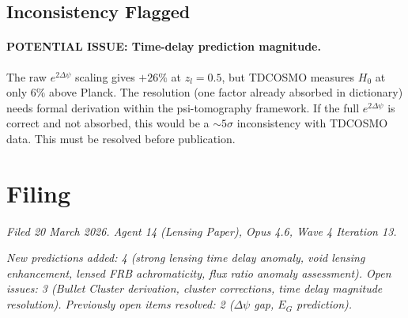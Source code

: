 \documentclass[11pt,a4paper]{article}
\newcommand{\Dpsi}{\Delta\psi}
\begin{document}
\subsection{Inconsistency Flagged}

\paragraph{POTENTIAL ISSUE: Time-delay prediction magnitude.}
The raw $e^{2\Dpsi}$ scaling gives $+26\%$ at $z_l = 0.5$,
but TDCOSMO measures $H_0$ at only $6\%$ above Planck.
The resolution (one factor already absorbed in dictionary)
needs formal derivation within the psi-tomography framework.
If the full $e^{2\Dpsi}$ is correct and not absorbed, this
would be a $\sim 5\sigma$ inconsistency with TDCOSMO data.
This must be resolved before publication.


\section*{Filing}

\textit{Filed 20 March 2026.  Agent 14 (Lensing Paper),
Opus 4.6, Wave 4 Iteration 13.}

\textit{New predictions added: 4 (strong lensing time delay
anomaly, void lensing enhancement, lensed FRB achromaticity,
flux ratio anomaly assessment).  Open issues: 3 (Bullet
Cluster derivation, cluster corrections, time delay magnitude
resolution).  Previously open items resolved: 2 ($\Dpsi$ gap,
$E_G$ prediction).}
\end{document}
